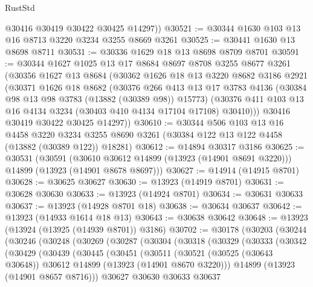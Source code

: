 \begin{lexlean}{RustStd}
\begin{coremodule}
        @30416
        @30419
        @30422
        @30425
        @14297))
@30521 := @30344 @1630 @103 @13 @16 @8713 @3220 @3234 @3255 @8669 @3261
@30525 := @30441 @1630 @13 @8698 @8711
@30531 := @30336 @1629 @18 @13 @8698 @8709 @8701
@30591 := @30344
    @1627
    @1025
    @13
    @17
    @8684
    @8697
    @8708
    @3255
    @8677
    @3261
    (@30356
      @1627
      @13
      @8684
      (@30362
        @1626
        @18
        @13
        @3220
        @8682
        @3186
        @2921
        (@30371
          @1626
          @18
          @8682
          (@30376
            @266
            @413
            @13
            @17
            @3783
            @4136
            (@30384 @98 @13 @98 @3783 (@13882 (@30389 @98)) @15773)
            (@30376 @411 @103 @13 @16 @4134 @3234 (@30403 @410 @4134 @17104 @17108) @30410)))
        @30416
        @30419
        @30422
        @30425
        @14297))
@30610 := @30344
    @506
    @103
    @13
    @16
    @4458
    @3220
    @3234
    @3255
    @8690
    @3261
    (@30384 @122 @13 @122 @4458 (@13882 (@30389 @122)) @18281)
@30612 := @14894 @30317 @3186
@30625 := @30531
    (@30591
      (@30610 @30612 @14899 (@13923 (@14901 @8691 @3220)))
      @14899
      (@13923 (@14901 @8678 @8697)))
@30627 := @14914 (@14915 @8701)
@30628 := @30625 @30627
@30630 := @13923 (@14919 @8701)
@30631 := @30628 @30630
@30633 := @13923 (@14924 @8701)
@30634 := @30631 @30633
@30637 := @13923 (@14928 @8701 @18)
@30638 := @30634 @30637
@30642 := @13923 (@14933 @1614 @18 @13)
@30643 := @30638 @30642
@30648 := @13923 (@13924 (@13925 (@14939 @8701)) @3186)
@30702 := @30178
    (@30203
      (@30244
        (@30246
          (@30248
            (@30269
              (@30287
                (@30304
                  (@30318
                    (@30329
                      (@30333
                        (@30342
                          (@30429
                            (@30439
                              (@30445
                                (@30451
                                  (@30511
                                    (@30521
                                      (@30525 (@30643 @30648))
                                      @30612
                                      @14899
                                      (@13923 (@14901 @8670 @3220)))
                                    @14899
                                    (@13923 (@14901 @8657 @8716)))
                                  @30627
                                  @30630
                                  @30633
                                  @30637

\end{coremodule}
\end{lexlean}
